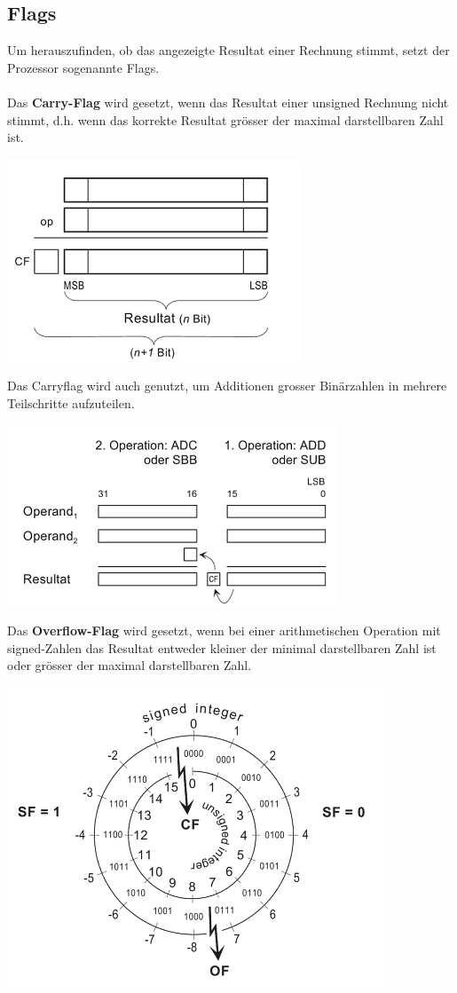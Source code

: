 \documentclass[a4paper,10pt]{report}
\begin{document}
\subsection{Flags}
Um herauszufinden, ob das angezeigte Resultat einer Rechnung stimmt, setzt der Prozessor sogenannte Flags. 
\\\\
Das \textbf{Carry-Flag} wird gesetzt, wenn das Resultat einer unsigned Rechnung nicht stimmt, d.h. wenn das korrekte Resultat grösser der maximal darstellbaren Zahl ist.\\
\begin{center}
\includegraphics[scale=0.85]{imgs/Carry.png}
\end{center}
Das Carryflag wird auch genutzt, um Additionen grosser Binärzahlen in mehrere Teilschritte aufzuteilen.
\begin{center}
\includegraphics[scale=0.85]{imgs/Carry2.png}
\end{center}
Das \textbf{Overflow-Flag} wird gesetzt, wenn bei einer arithmetischen Operation mit signed-Zahlen das Resultat entweder kleiner der minimal darstellbaren Zahl ist oder grösser der maximal darstellbaren Zahl.\\
\begin{center}
\includegraphics[scale=0.85]{imgs/Zahlenkreis.png}
\end{center}
\end{document}
